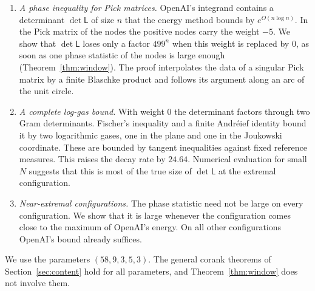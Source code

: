 \documentclass[11pt]{amsart}
\theoremstyle{definition}
\theoremstyle{remark}
\numberwithin{equation}{section}
\begin{document}
\begin{enumerate}[label=\arabic*.,wide]
\item \emph{A phase inequality for Pick matrices.} OpenAI's integrand contains a determinant
$\det\mathsf L$ of size $n$ that the energy method bounds by $e^{O(n\log n)}$. In the Pick matrix of the nodes the
positive nodes carry the weight $-5$. We show that $\det\mathsf L$ loses only a factor $499^n$ when this
weight is replaced by $0$, as soon as one phase statistic of the nodes is large enough
(Theorem~\ref{thm:window}). The proof interpolates the data of a singular Pick matrix by a finite Blaschke
product and follows its argument along an arc of the unit circle.

\item \emph{A complete log-gas bound.} With weight $0$ the determinant factors through two Gram
determinants. Fischer's inequality and a finite Andr\'eief identity bound it by two logarithmic gases, one
in the plane and one in the Joukowski coordinate. These are bounded by tangent inequalities against fixed
reference measures. This raises the decay rate by $24.64$. Numerical evaluation for small $N$ suggests that
this is most of the true size of $\det\mathsf L$ at the extremal configuration.

\item \emph{Near-extremal configurations.} The phase statistic need not be large on every configuration.
We show that it is large whenever the configuration comes close to the maximum of OpenAI's energy. On all
other configurations OpenAI's bound already suffices.
\end{enumerate}
We use the parameters $(58,9,3,5,3)$. The general corank theorems of Section~\ref{sec:content} hold for all
parameters, and Theorem~\ref{thm:window} does not involve them.
\end{document}
